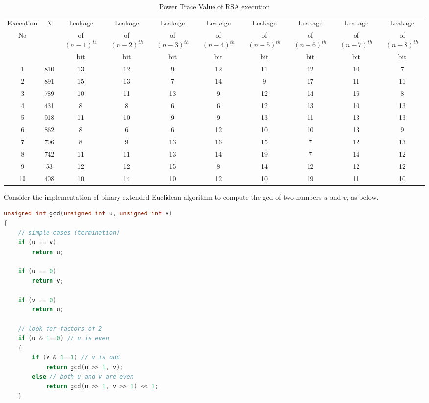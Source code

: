 \documentclass{article}
\begin{document}
\begin{questions}
\begin{table}[h]
\scriptsize
\centering
\caption{Power Trace Value of RSA execution}
\begin{tabular}{|c|c|c|c|c|c|c|c|c|c|}
\hline
Execution & $X$ & Leakage  & Leakage  & Leakage & Leakage& Leakage & Leakage& Leakage & Leakage   \\
No       &     & of $(n-1)^{th}$  & of $(n-2)^{th}$ & of $(n-3)^{th}$ & of $(n-4)^{th}$ & of $(n-5)^{th}$ & of $(n-6)^{th}$ & of $(n-7)^{th}$& of $(n-8)^{th}$ \\ 
        &      &    bit        & bit     &  bit    &   bit   &  bit   & bit    & bit    & bit  \\                                                       \hline
1  & 810 & 13 &12 &9 & 12& 11& 12 &10 &7 \\ \hline
2 & 891 & 15 & 13 &7 &14 &9 &17 &11 &11 \\ \hline
3 & 789 &10 &11 &13 &9 &12 &14 &16 & 8 \\ \hline 
4 & 431 & 8 &8 &6 &6 &12 &13 &10 &13 \\ \hline
5 & 918 & 11 & 10 & 9 &9 & 13 &11 &13&13 \\ \hline
6 & 862 & 8 & 6 &6&12 &10 &10 &13 &9 \\ \hline
7 & 706 & 8 & 9 &13 &16 &15 &7 &12 &13 \\ \hline
8 &742 &11 &11 &13 &14 &19 &7 &14 & 12 \\ \hline
9 & 53& 12& 12&15&8&14&12&12&12 \\ \hline
10 & 408 &10&14&10&12&10&19&11& 10 \\ \hline
\end{tabular}
\end{table}


\question Consider the implementation of binary extended Euclidean algorithm to compute the 
gcd of two numbers $u$ and $v$, as below.

\begin{lstlisting}[language=C]
unsigned int gcd(unsigned int u, unsigned int v)
{
    // simple cases (termination)
    if (u == v)
        return u;

    if (u == 0)
        return v;

    if (v == 0)
        return u;

    // look for factors of 2
    if (u & 1==0) // u is even
    {
        if (v & 1==1) // v is odd
            return gcd(u >> 1, v);
        else // both u and v are even
            return gcd(u >> 1, v >> 1) << 1;
    }


\end{lstlisting}
\end{questions}
\end{document}
